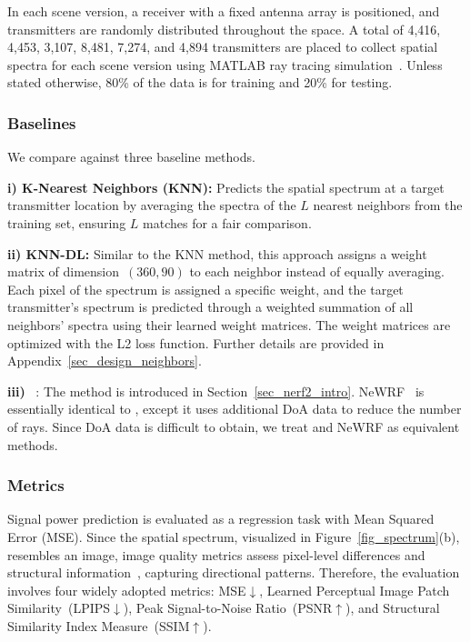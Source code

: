 In each scene version, a receiver with a fixed antenna array is positioned, and transmitters are randomly distributed throughout the space. 
A total of 4,416, 4,453, 3,107, 8,481, 7,274, and 4,894 transmitters are placed to collect spatial spectra for each scene version using MATLAB ray tracing simulation~\cite{matlab_indoor_simulation}.
Unless stated otherwise, 80\% of the data is for training and 20\% for testing.



\subsubsection{Baselines}
We compare \ourSystem against three baseline methods.

\textbf{i) K-Nearest Neighbors (KNN):}  
Predicts the spatial spectrum at a target transmitter location by averaging the spectra of the \( L \) nearest neighbors from the training set, ensuring \( L \) matches \ourSystem for a fair comparison.

\textbf{ii) KNN-DL:}
Similar to the KNN method, this approach assigns a weight matrix of dimension~\( (360, 90) \) to each neighbor instead of equally averaging. 
Each pixel of the spectrum is assigned a specific weight, and the target transmitter's spectrum is predicted through a weighted summation of all neighbors' spectra using their learned weight matrices. 
The weight matrices are optimized with the L2 loss function. 
Further details are provided in Appendix~\ref{sec_design_neighbors}.



\textbf{iii) \nerft}~\cite{zhao2023nerf}: The method is introduced in Section~\ref{sec_nerf2_intro}. NeWRF~\cite{lunewrf} is essentially identical to \nerft, except it uses additional DoA data to reduce the number of rays. 
Since DoA data is difficult to obtain, we treat \nerft and NeWRF as equivalent methods.



\subsubsection{Metrics}  
Signal power prediction is evaluated as a regression task with Mean Squared Error (MSE). 
Since the spatial spectrum, visualized in Figure~\ref{fig_spectrum}(b), resembles an image, image quality metrics assess pixel-level differences and structural information~\cite{wang2004image}, capturing directional patterns. 
Therefore, the evaluation involves four widely adopted metrics: MSE$\downarrow$, Learned Perceptual Image Patch Similarity~(LPIPS$\downarrow$), Peak Signal-to-Noise Ratio~(PSNR$\uparrow$), and Structural Similarity Index Measure~(SSIM$\uparrow$).





